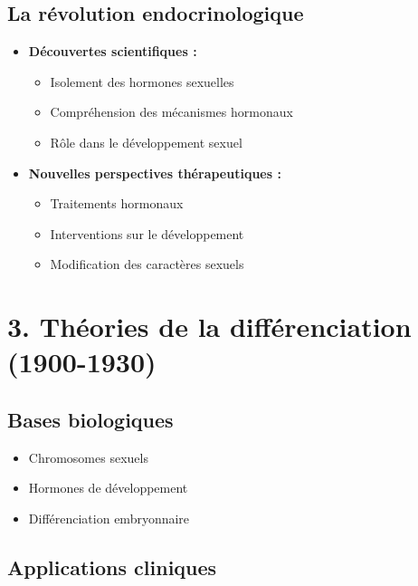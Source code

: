 \documentclass[
  letterpaper,
  DIV=11,
  numbers=noendperiod]{scrreprt}
\providecommand{\tightlist}{%
  \setlength{\itemsep}{0pt}\setlength{\parskip}{0pt}}\usepackage{longtable,booktabs,array}
\begin{document}
\subsection{La révolution
endocrinologique}\label{la-ruxe9volution-endocrinologique}

\begin{itemize}
\tightlist
\item
  \textbf{Découvertes scientifiques :}

  \begin{itemize}
  \tightlist
  \item
    Isolement des hormones sexuelles
  \item
    Compréhension des mécanismes hormonaux
  \item
    Rôle dans le développement sexuel
  \end{itemize}
\item
  \textbf{Nouvelles perspectives thérapeutiques :}

  \begin{itemize}
  \tightlist
  \item
    Traitements hormonaux
  \item
    Interventions sur le développement
  \item
    Modification des caractères sexuels
  \end{itemize}
\end{itemize}

\section{3. Théories de la différenciation
(1900-1930)}\label{thuxe9ories-de-la-diffuxe9renciation-1900-1930}

\subsection{Bases biologiques}\label{bases-biologiques}

\begin{itemize}
\tightlist
\item
  Chromosomes sexuels
\item
  Hormones de développement
\item
  Différenciation embryonnaire
\end{itemize}

\subsection{Applications cliniques}\label{applications-cliniques}
\end{document}
